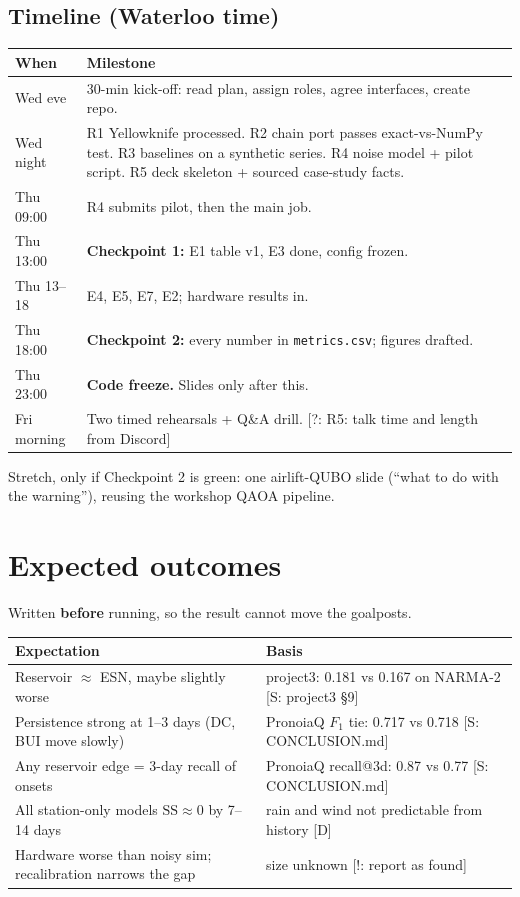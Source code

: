 \documentclass[11pt,a4paper]{article}
\newcommand{\tagbox}[2]{{\footnotesize\color{#1}\textsf{[#2]}}}
\newcommand{\supp}[1]{\tagbox{ForestGreen!70!black}{S: #1}}  %
\newcommand{\ours}{\tagbox{NavyBlue}{D}}                      %
\newcommand{\caut}[1]{\tagbox{BrickRed}{!: #1}}               %
\newcommand{\todo}[1]{\tagbox{Orange!85!black}{?: #1}}        %
\newcommand{\code}[1]{\texttt{\small #1}}
\begin{document}
\subsection{Timeline (Waterloo time)}
\begin{center}\small
\begin{tabularx}{\linewidth}{@{}l Y@{}}
\toprule
\textbf{When} & \textbf{Milestone}\\
\midrule
Wed eve & 30-min kick-off: read plan, assign roles, agree interfaces, create repo.\\
Wed night & R1 Yellowknife processed. R2 chain port passes exact-vs-NumPy test. R3 baselines on a synthetic series.
R4 noise model + pilot script. R5 deck skeleton + sourced case-study facts.\\
Thu 09:00 & R4 submits pilot, then the main job.\\
Thu 13:00 & \textbf{Checkpoint 1:} E1 table v1, E3 done, config frozen.\\
Thu 13--18 & E4, E5, E7, E2; hardware results in.\\
Thu 18:00 & \textbf{Checkpoint 2:} every number in \code{metrics.csv}; figures drafted.\\
Thu 23:00 & \textbf{Code freeze.} Slides only after this.\\
Fri morning & Two timed rehearsals + Q\&A drill. \todo{R5: talk time and length from Discord}\\
\bottomrule
\end{tabularx}
\end{center}

Stretch, only if Checkpoint 2 is green: one airlift-QUBO slide (``what to do with the warning''), reusing the workshop
QAOA pipeline.

\section{Expected outcomes}
Written \textbf{before} running, so the result cannot move the goalposts.

\begin{center}\small
\begin{tabularx}{\linewidth}{@{}Y Y@{}}
\toprule
\textbf{Expectation} & \textbf{Basis}\\
\midrule
Reservoir $\approx$ ESN, maybe slightly worse & project3: 0.181 vs 0.167 on NARMA-2 \supp{project3 \S9}\\
Persistence strong at 1--3 days (DC, BUI move slowly) & PronoiaQ $F_1$ tie: 0.717 vs 0.718 \supp{CONCLUSION.md}\\
Any reservoir edge = 3-day recall of onsets & PronoiaQ recall@3d: 0.87 vs 0.77 \supp{CONCLUSION.md}\\
All station-only models $\mathrm{SS}\approx0$ by 7--14 days & rain and wind not predictable from history \ours\\
Hardware worse than noisy sim; recalibration narrows the gap & size unknown \caut{report as found}\\
\bottomrule
\end{tabularx}
\end{center}
\end{document}
